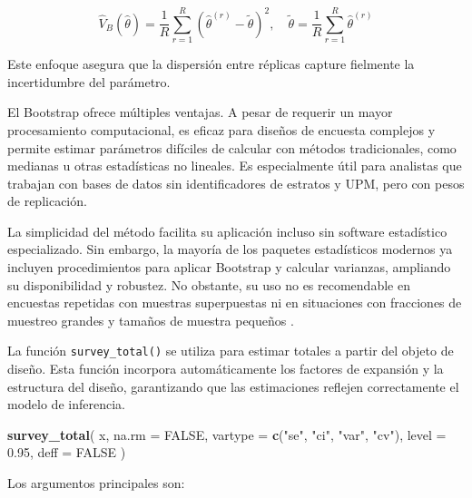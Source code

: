 \documentclass[
  spanish,
  12pt,
]{book}
\newenvironment{Shaded}{\begin{snugshade}}{\end{snugshade}}
\newcommand{\AttributeTok}[1]{\textcolor[rgb]{0.13,0.29,0.53}{#1}}
\newcommand{\ConstantTok}[1]{\textcolor[rgb]{0.56,0.35,0.01}{#1}}
\newcommand{\FloatTok}[1]{\textcolor[rgb]{0.00,0.00,0.81}{#1}}
\newcommand{\FunctionTok}[1]{\textcolor[rgb]{0.13,0.29,0.53}{\textbf{#1}}}
\newcommand{\NormalTok}[1]{#1}
\newcommand{\StringTok}[1]{\textcolor[rgb]{0.31,0.60,0.02}{#1}}
\begin{document}
\[
\hat{V}_B(\hat{\theta}) = \frac{1}{R} \sum_{r=1}^{R} \left(\hat{\theta}^{(r)} - \tilde{\theta}\right)^2, \quad
\tilde{\theta} = \frac{1}{R} \sum_{r=1}^{R} \hat{\theta}^{(r)}
\]

Este enfoque asegura que la dispersión entre réplicas capture fielmente la incertidumbre del parámetro.

El Bootstrap ofrece múltiples ventajas. A pesar de requerir un mayor procesamiento computacional, es eficaz para diseños de encuesta complejos y permite estimar parámetros difíciles de calcular con métodos tradicionales, como medianas u otras estadísticas no lineales. Es especialmente útil para analistas que trabajan con bases de datos sin identificadores de estratos y UPM, pero con pesos de replicación.

La simplicidad del método facilita su aplicación incluso sin software estadístico especializado. Sin embargo, la mayoría de los paquetes estadísticos modernos ya incluyen procedimientos para aplicar Bootstrap y calcular varianzas, ampliando su disponibilidad y robustez. No obstante, su uso no es recomendable en encuestas repetidas con muestras superpuestas ni en situaciones con fracciones de muestreo grandes y tamaños de muestra pequeños \citep{bruch2011variance}.

La función \texttt{survey\_total()} se utiliza para estimar totales a partir del objeto de diseño. Esta función incorpora automáticamente los factores de expansión y la estructura del diseño, garantizando que las estimaciones reflejen correctamente el modelo de inferencia.

\begin{Shaded}
\begin{Highlighting}[]
\FunctionTok{survey\_total}\NormalTok{(}
\NormalTok{  x,}
  \AttributeTok{na.rm =} \ConstantTok{FALSE}\NormalTok{,}
  \AttributeTok{vartype =} \FunctionTok{c}\NormalTok{(}\StringTok{"se"}\NormalTok{, }\StringTok{"ci"}\NormalTok{, }\StringTok{"var"}\NormalTok{, }\StringTok{"cv"}\NormalTok{),}
  \AttributeTok{level =} \FloatTok{0.95}\NormalTok{,}
  \AttributeTok{deff =} \ConstantTok{FALSE}
\NormalTok{)}
\end{Highlighting}
\end{Shaded}

Los argumentos principales son:
\end{document}

